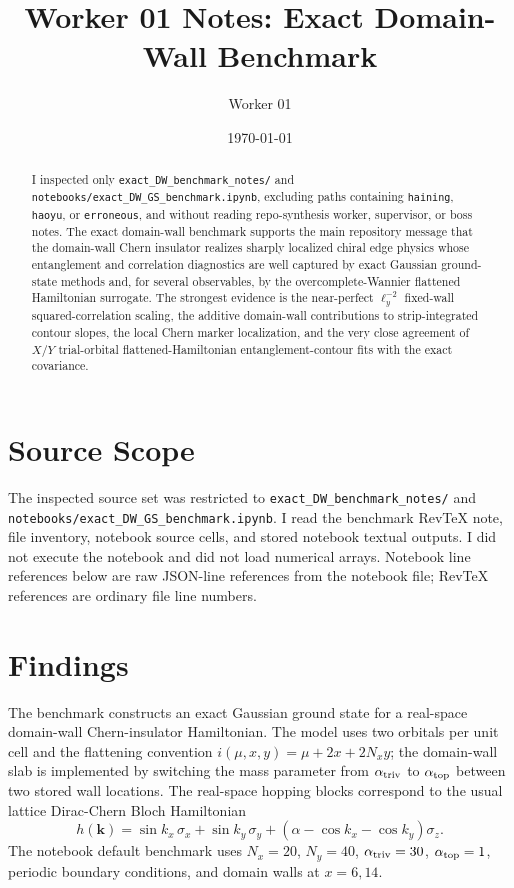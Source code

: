 \documentclass[aps,prb,onecolumn,nofootinbib,superscriptaddress]{revtex4-2}
\begin{document}
\title{Worker 01 Notes: Exact Domain-Wall Benchmark}
\author{Worker 01}
\date{\today}

\begin{abstract}
I inspected only \texttt{exact\_DW\_benchmark\_notes/} and
\texttt{notebooks/exact\_DW\_GS\_benchmark.ipynb}, excluding paths containing
\texttt{haining}, \texttt{haoyu}, or \texttt{erroneous}, and without reading
repo-synthesis worker, supervisor, or boss notes.  The exact domain-wall
benchmark supports the main repository message that the domain-wall Chern
insulator realizes sharply localized chiral edge physics whose entanglement and
correlation diagnostics are well captured by exact Gaussian ground-state
methods and, for several observables, by the overcomplete-Wannier flattened
Hamiltonian surrogate.  The strongest evidence is the near-perfect
$\ell_y^{-2}$ fixed-wall squared-correlation scaling, the additive
domain-wall contributions to strip-integrated contour slopes, the local Chern
marker localization, and the very close agreement of $X/Y$ trial-orbital
flattened-Hamiltonian entanglement-contour fits with the exact covariance.
\end{abstract}

\maketitle
\setcounter{tocdepth}{2}
\tableofcontents

\section{Source Scope}
The inspected source set was restricted to
\texttt{exact\_DW\_benchmark\_notes/} and
\texttt{notebooks/exact\_DW\_GS\_benchmark.ipynb}.  I read the benchmark
RevTeX note, file inventory, notebook source cells, and stored notebook textual
outputs.  I did not execute the notebook and did not load numerical arrays.
Notebook line references below are raw JSON-line references from the notebook
file; RevTeX references are ordinary file line numbers.

\section{Findings}
The benchmark constructs an exact Gaussian ground state for a real-space
domain-wall Chern-insulator Hamiltonian.  The model uses two orbitals per unit
cell and the flattening convention
$i(\mu,x,y)=\mu+2x+2N_x y$; the domain-wall slab is implemented by switching
the mass parameter from $\alpha_{\rm triv}$ to $\alpha_{\rm top}$ between two
stored wall locations.  The real-space hopping blocks correspond to the usual
lattice Dirac-Chern Bloch Hamiltonian
\begin{equation}
h(\bm{k})=\sin k_x\,\sigma_x+\sin k_y\,\sigma_y+
(\alpha-\cos k_x-\cos k_y)\sigma_z .
\end{equation}
The notebook default benchmark uses $N_x=20$, $N_y=40$,
$\alpha_{\rm triv}=30$, $\alpha_{\rm top}=1$, periodic boundary conditions,
and domain walls at $x=6,14$.
\end{document}
